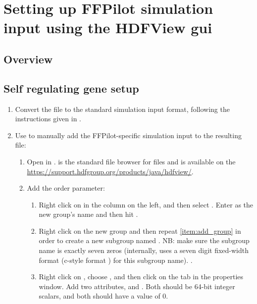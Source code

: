 \chapter{Setting up FFPilot simulation input using the HDFView gui}

\section{Overview}

\section{Self regulating gene setup}
\begin{enumerate}
    \item Convert the  file to the standard  simulation input format, following the instructions given in .
    \item Use  to manually add the FFPilot-specific simulation input to the resulting \\  file:
    \begin{enumerate}
        \item Open  in .  is the standard file browser for  files and is available on the \href{HDF Group's website}{https://support.hdfgroup.org/products/java/hdfview/}.
        \item{Add the order parameter:}
        \begin{enumerate}
            \item\label{item:add_group} Right click on  in the column on the left, and then select . Enter  as the new group's name and then hit .
            \item Right click on the new  group and then repeat \ref{item:add_group} in order to create a new subgroup named . NB: make sure the subgroup name is exactly seven zeros (internally,  uses a seven digit fixed-width format (c-style format ) for this subgroup name). .
            \item Right click on , choose , and then click on the  tab in the properties window. Add two attributes,  and . Both should be 64-bit integer scalars, and both should have a value of 0.

\end{enumerate}
\end{enumerate}
\end{enumerate}
